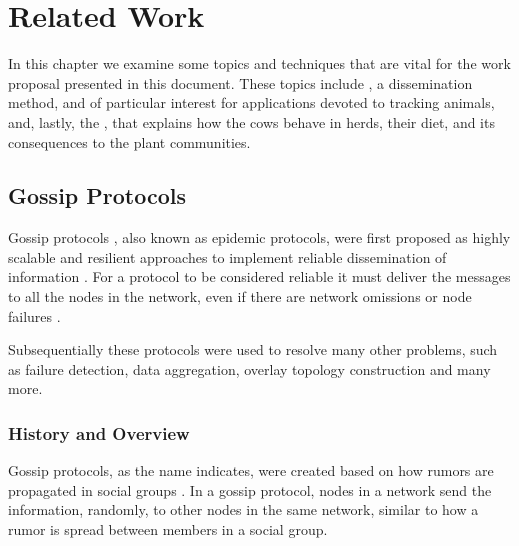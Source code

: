 
%

\chapter{Related Work}
\label{cha:related_work}
In this chapter we examine some topics and techniques that are vital for the work proposal
presented in this document. These topics include , a dissemination
method,  and of particular interest for applications
devoted to tracking animals, and, lastly, the , that explains how the cows behave in herds,
their diet, and its consequences to the plant communities. %

\section{Gossip Protocols}
\label{sec:gossip_protocols}
Gossip protocols \cite{Demers1987}, also known as epidemic protocols, were first proposed as
highly scalable and resilient approaches to implement reliable dissemination of information
\cite{Bakhshi2007, Friedman2009, Kermarrec2007}. For a protocol to be considered reliable it
must deliver the messages to all the nodes in the network, even if there are network omissions
or node failures \cite{Leitao2012}.

Subsequentially these protocols were used to resolve many other problems, such as failure detection,
data aggregation, overlay topology construction and many more\cite{Montresor2017}.

\subsection{History and Overview}
\label{subsec:gossip_history_overview}
Gossip protocols, as the name indicates, were created based on how rumors are propagated in
social groups \cite{Leitao2007}. In a gossip protocol, nodes in a network send the information, randomly, to
other nodes in the same network, similar to how a rumor is spread between members in a social
group.

